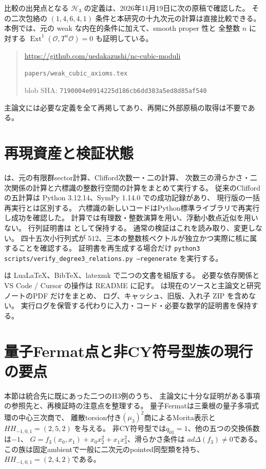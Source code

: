 \documentclass[11pt,a4paper]{ltjsarticle}
\begin{document}
比較の出発点となる $\mathcal H_3$ の定義は、2026年11月19日に次の原稿で確認した。
その二次包絡の $(1,4,6,4,1)$ 条件と本研究の十九次元の計算は直接比較できる。
本例では、元の weak な内在的条件に加えて、smooth proper 性と
全整数 $n$ に対する $\operatorname{Ext}^1(\mathcal O,T^n\mathcal O)=0$ も証明している。
\begin{quote}\small
\url{https://github.com/uedakazushi/nc-cubic-moduli}\par
\texttt{papers/weak\_cubic\_axioms.tex}\par
blob SHA: \texttt{7190004e0914225d186cb6dd383a5ed8d85af540}
\end{quote}
主論文には必要な定義を全て再掲してあり、再開に外部原稿の取得は不要である。

\section{再現資産と検証状態}
 は、元の有限群sector計算、Clifford次数一・二の計算、
次数三の滑らかさ・二次関係の計算と六標識の整数行空間の計算をまとめて実行する。
従来のCliffordの五計算は Python 3.12.14、SymPy 1.14.0 での成功記録があり、
現行版の一括再実行とは区別する。
六標識の新しいコードはPython標準ライブラリで再実行し成功を確認した。
計算では有理数・整数演算を用い、浮動小数点近似を用いない。
行列証明書は  として保持する。
通常の検証はこれを読み取り、変更しない。
四十五次小行列式が $512$、三本の整数核ベクトルが独立かつ実際に核に属することを確認する。
証明書を再生成する場合だけ
\texttt{python3 scripts/verify\_degree3\_relations.py --regenerate} を実行する。

 は LuaLaTeX、BibTeX、latexmk で二つの文書を組版する。
必要な依存関係と VS Code / Cursor の操作は README に記す。
 は現在のソースと主論文と研究ノートのPDF だけをまとめ、
ログ、キャッシュ、旧版、入れ子 ZIP を含めない。
実行ログを保管する代わりに入力・コード・必要な数学的証明書を保持する。


\section{量子Fermat点と非CY符号型族の現行の要点}
本節は統合先に既にあった二つのH3例のうち、
主論文に十分な証明がある事項の参照先と、再検証時の注意点を整理する。
量子Fermatは三乗根の量子多項式環の中心三次商で、
離散torsion付き$(\mu_3)^2$商によるMorita表示と
$HH_{-1,0,1}=(2,5,2)$ を与える。
非CY符号型では$q_{01}=1$、他の五つの交換係数は$-1$、
$G=f_3(x_0,x_1)+x_0x_2^2+x_1x_3^2$、滑らかさ条件は
$a d\Delta(f_3)\ne0$である。
この族は固定ambientで一般に二次元のpointed同型類を持ち、
$HH_{-1,0,1}=(2,4,2)$である。
\end{document}
